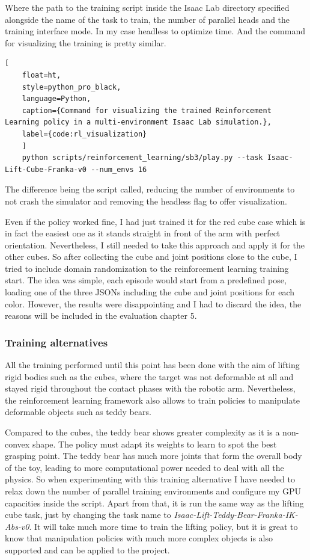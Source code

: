 Where the path to the training script inside the Isaac Lab directory specified alongside the name of the task to train, the number of parallel heads and the training interface mode. In my case headless to optimize time. And the command for visualizing the training is pretty similar. 

\begin{lstlisting}[
	float=ht, 
	style=python_pro_black,
	language=Python, 
	caption={Command for visualizing the trained Reinforcement Learning policy in a multi-environment Isaac Lab simulation.},
	label={code:rl_visualization}
	]
	python scripts/reinforcement_learning/sb3/play.py --task Isaac-Lift-Cube-Franka-v0 --num_envs 16
\end{lstlisting}

The difference being the script called, reducing the number of environments to not crash the simulator and removing the headless flag to offer visualization. 

Even if the policy worked fine, I had just trained it for the red cube case which is in fact the easiest one as it stands straight in front of the arm with perfect orientation. Nevertheless, I still needed to take this approach and apply it for the other cubes. So after collecting the cube and joint positions close to the cube, I tried to include domain randomization to the reinforcement learning training start. The idea was simple, each episode would start from a predefined pose, loading one of the three JSONs including the cube and joint positions for each color. However, the results were disappointing and I had to discard the idea, the reasons will be included in the evaluation chapter 5. 

\subsubsection{Training alternatives}
All the training performed until this point has been done with the aim of lifting rigid bodies such as the cubes, where the target was not deformable at all and stayed rigid throughout the contact phases with the robotic arm. Nevertheless, the reinforcement learning framework also allows to train policies to manipulate deformable objects such as teddy bears. 

Compared to the cubes, the teddy bear shows greater complexity as it is a non-convex shape. The policy must adapt its weights to learn to spot the best grasping point. The teddy bear has much more joints that form the overall body of the toy, leading to more computational power needed to deal with all the physics. So when experimenting with this training alternative I have needed to relax down the number of parallel training environments and configure my GPU capacities inside the script. Apart from that, it is run the same way as the lifting cube task, just by changing the task name to \textit{Isaac-Lift-Teddy-Bear-Franka-IK-Abs-v0}. It will take much more time to train the lifting policy, but it is great to know that manipulation policies with much more complex objects is also supported and can be applied to the project.  

